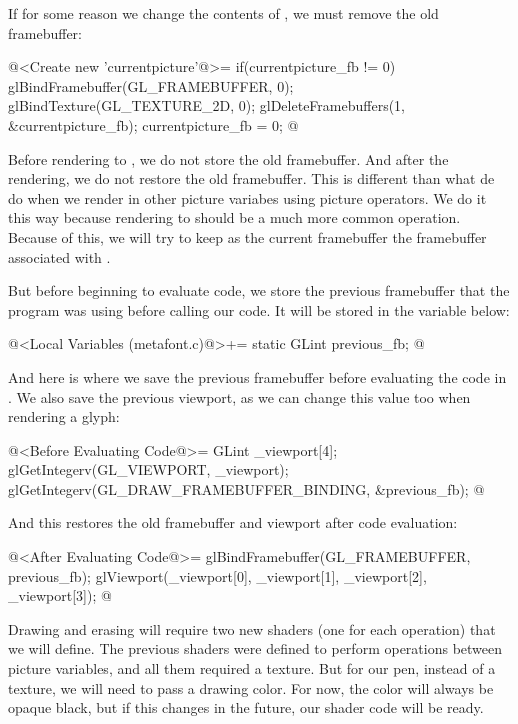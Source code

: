 {{{{{If for some reason we change the contents
of , we must remove the old framebuffer:

\iniciocodigo
@<Create new 'currentpicture'@>=
{
  if(currentpicture_fb != 0){
    glBindFramebuffer(GL_FRAMEBUFFER, 0);
    glBindTexture(GL_TEXTURE_2D, 0);
    glDeleteFramebuffers(1, &currentpicture_fb);
  }
  currentpicture_fb = 0;
}
@
\fimcodigo

Before rendering to , we do not store the
old framebuffer. And after the rendering, we do not restore the old
framebuffer. This is different than what de do when we render in other
picture variabes using picture operators. We do it this way because
rendering to  should be a much more common
operation. Because of this, we will try to keep as the current
framebuffer the framebuffer associated
with .

But before beginning to evaluate code, we store the previous
framebuffer that the program was using before calling our code. It
will be stored in the variable below:

\iniciocodigo
@<Local Variables (metafont.c)@>+=
static GLint previous_fb;
@
\fimcodigo

And here is where we save the previous framebuffer before evaluating
the code in . We also save the
previous viewport, as we can change this value too when rendering a
glyph:

\iniciocodigo
@<Before Evaluating Code@>=
GLint _viewport[4];
glGetIntegerv(GL_VIEWPORT, _viewport);
glGetIntegerv(GL_DRAW_FRAMEBUFFER_BINDING, &previous_fb);
@
\fimcodigo

And this restores the old framebuffer and viewport after code
evaluation:

\iniciocodigo
@<After Evaluating Code@>=
glBindFramebuffer(GL_FRAMEBUFFER, previous_fb);
glViewport(_viewport[0], _viewport[1], _viewport[2], _viewport[3]);
@
\fimcodigo


Drawing and erasing will require two new shaders (one for each
operation) that we will define. The previous shaders were defined to
perform operations between picture variables, and all them required a
texture. But for our pen, instead of a texture, we will need to pass a
drawing color. For now, the color will always be opaque black, but if
this changes in the future, our shader code will be ready.

}}}}}
